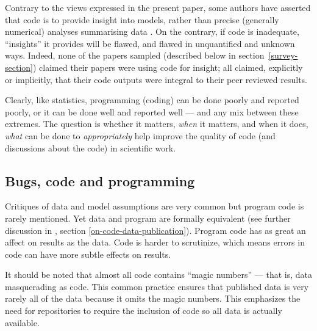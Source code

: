 Contrary to the views expressed in the present paper, some authors have asserted that code is to provide insight into models, rather than precise (generally numerical) analyses summarising data \cite{assessing-quality}. On the contrary, if code is inadequate, ``insights'' it provides will be flawed, and flawed in unquantified and unknown ways. Indeed, none of the papers sampled (described below in section~\ref{survey-section}) claimed their papers were using code for insight; all claimed, explicitly or implicitly, that their code outputs were integral to their peer reviewed results.

Clearly, like statistics, programming (coding) can be done poorly and reported poorly, or it can be done well and reported well --- and any mix between these extremes. The question is whether it matters, \emph{when\/} it matters, and when it does, \emph{what\/} can be done to \emph{appropriately\/} help improve the quality of code (and discussions about the code) in scientific work.


\subsection{Bugs, code and programming}\label{knowledge}
Critiques of data and model assumptions are very common \cite{critiques,diagnosis-reviews} but program code is rarely mentioned. Yet data and program are formally equivalent (see further discussion in \supplement, section \ref{on-code-data-publication}). Program code has as great an affect on results as the data. Code is harder to scrutinize, which means errors in code can have more subtle effects on results.

It should be noted that almost all code contains ``magic numbers'' --- that is, data masquerading as code. This common practice ensures that published data is very rarely all of the data because it omits the magic numbers. This emphasizes the need for repositories to require the inclusion of code so all data is actually available. 

